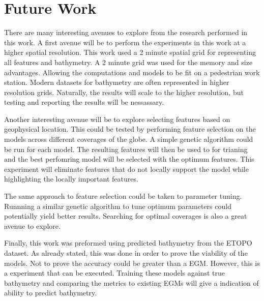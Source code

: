 \section{Future Work}
\setlength{\parindent}{10ex}
There are many interesting avenues to explore from the research performed in this work.
A first avenue will be to perform the experiments in this work at a higher spatial resolution.
This work used a 2 minute spatial grid for representing all features and bathymetry.
A 2 minute grid was used for the memory and size advantages.
Allowing the computations and models to be fit on a pedestrian work station.
Modern datasets for bathymetry are often represented in higher resolution grids.
Naturally, the results will scale to the higher resolution, but testing and reporting the results will be nessassary.

\par
Another interesting avenue will be to explore selecting features based on geophysical location.
This could be tested by performing feature selection on the models across different coverages of the globe.
A simple genetic algorithm could be run for each model.
The resulting features will then be used to for trianing and the best perfomring model will be selected with the optimum features.
This experiment will eliminate features that do not locally support the model while highlighting the locally important features.

\par
The same approach to feature selection could be taken to parameter tuning.
Runnning a similar genetic algorithm to tune optimum parameters could potentially yield better results.
Searching for optimal coverages is also a great avenue to explore.

\par
Finally, this work was preformed using predicted bathymetry from the ETOPO dataset.
As already stated, this was done in order to prove the viability of the models.
Not to prove the accuracy could be greater than a \ac{EGM}.
However, this is a experiment that can be executed.
Training these models against true bathymetry and comparing the metrics to existing \ac{EGM}s will give a indication of ability to predict bathymetry.